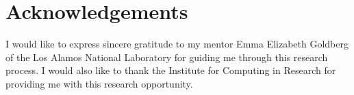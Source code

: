 \documentclass[final,5p,times,twocolumn,authoryear]{elsarticle}
\begin{document}
\section{Acknowledgements}
\label{acknowledgements}
I would like to express sincere gratitude to my mentor Emma Elizabeth Goldberg of the Los Alamos National Laboratory for guiding me through this research process. I would also like to thank the Institute for Computing in Research for providing me with this research opportunity. 


 







\end{document}

